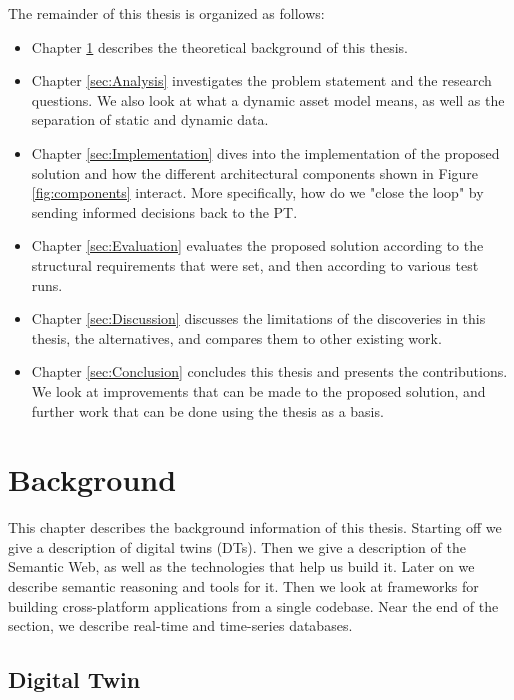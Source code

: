 \documentclass{article}
\begin{document}
The remainder of this thesis is organized as follows:
\begin{itemize}
    \item Chapter \ref{sec:Background} describes the theoretical background of this thesis.
    \item Chapter \ref{sec:Analysis} investigates the problem statement and the research questions. We also look at what a dynamic asset model means, as well as the separation of static and dynamic data.  
    \item Chapter \ref{sec:Implementation} dives into the implementation of the proposed solution and how the different architectural components shown in Figure \ref{fig:components} interact. More specifically, how do we "close the loop" by sending informed decisions back to the PT. 
    \item Chapter \ref{sec:Evaluation} evaluates the proposed solution according to the structural requirements that were set, and then according to various test runs.
    \item Chapter \ref{sec:Discussion} discusses the limitations of the discoveries in this thesis, the alternatives, and compares them to other existing work.
    \item Chapter \ref{sec:Conclusion} concludes this thesis and presents the contributions. We look at improvements that can be made to the proposed solution, and further work that can be done using the thesis as a basis.  
\end{itemize}



\newpage
\section{Background}\label{sec:Background}
This chapter describes the background information of this thesis. Starting off we give a description of digital twins (DTs). Then we give a description of the Semantic Web, as well as the technologies that help us build it. Later on we describe semantic reasoning and tools for it. Then we look at frameworks for building cross-platform applications from a single codebase. Near the end of the section, we describe real-time and time-series databases.

\subsection{Digital Twin}\label{subsec:DigitalTwins}
\end{document}
